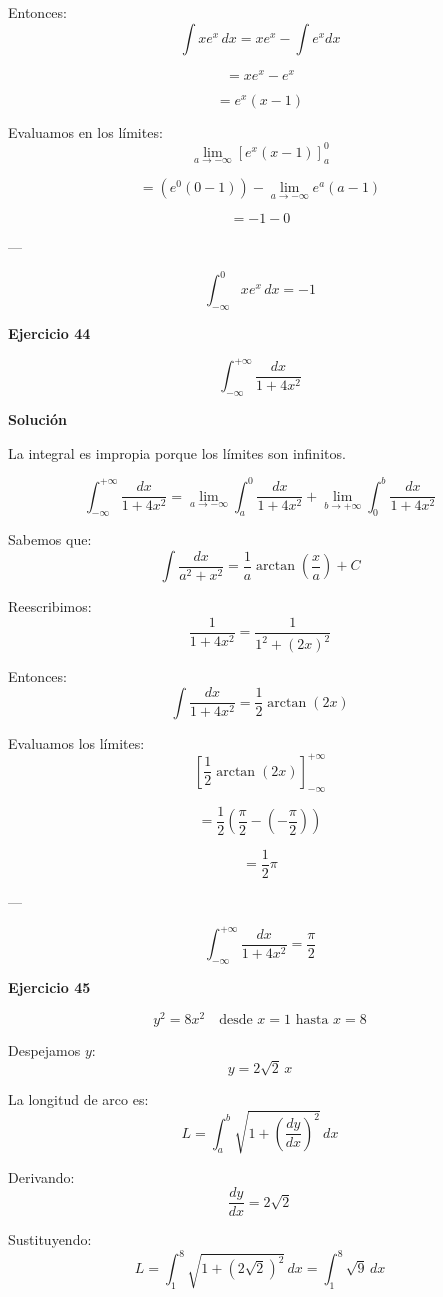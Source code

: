 \documentclass{article}
\begin{document}
Entonces:
\[
\int x e^x \, dx = x e^x - \int e^x dx
\]

\[
= x e^x - e^x
\]

\[
= e^x (x - 1)
\]

Evaluamos en los límites:
\[
\lim_{a \to -\infty}
\left[ e^x (x - 1) \right]_{a}^{0}
\]

\[
= \left( e^0 (0 - 1) \right)
- \lim_{a \to -\infty} e^a (a - 1)
\]

\[
= -1 - 0
\]

---

\[
\boxed{\int_{-\infty}^{0} x e^x \, dx = -1}
\]


\textbf{Ejercicio 44}

\[
\int_{-\infty}^{+\infty} \frac{dx}{1 + 4x^2}
\]

\textbf{Solución}

La integral es impropia porque los límites son infinitos.

\[
\int_{-\infty}^{+\infty} \frac{dx}{1 + 4x^2}
= \lim_{a \to -\infty} \int_{a}^{0} \frac{dx}{1 + 4x^2}
+ \lim_{b \to +\infty} \int_{0}^{b} \frac{dx}{1 + 4x^2}
\]

Sabemos que:
\[
\int \frac{dx}{a^2 + x^2} = \frac{1}{a} \arctan\left(\frac{x}{a}\right) + C
\]

Reescribimos:
\[
\frac{1}{1 + 4x^2} = \frac{1}{1^2 + (2x)^2}
\]

Entonces:
\[
\int \frac{dx}{1 + 4x^2}
= \frac{1}{2} \arctan(2x)
\]

Evaluamos los límites:
\[
\left[ \frac{1}{2} \arctan(2x) \right]_{-\infty}^{+\infty}
\]

\[
= \frac{1}{2}
\left( \frac{\pi}{2} - \left(-\frac{\pi}{2}\right) \right)
\]

\[
= \frac{1}{2} \pi
\]

---

\[
\boxed{\int_{-\infty}^{+\infty} \frac{dx}{1 + 4x^2} = \frac{\pi}{2}}
\]




\textbf{Ejercicio 45}

\[
y^2 = 8x^2 \quad \text{desde } x=1 \text{ hasta } x=8
\]

Despejamos \(y\):
\[
y = 2\sqrt{2}\,x
\]

La longitud de arco es:
\[
L=\int_a^b \sqrt{1+\left(\frac{dy}{dx}\right)^2}\,dx
\]

Derivando:
\[
\frac{dy}{dx} = 2\sqrt{2}
\]

Sustituyendo:
\[
L=\int_{1}^{8} \sqrt{1+(2\sqrt{2})^2}\,dx
= \int_{1}^{8} \sqrt{9}\,dx
\]
\end{document}
